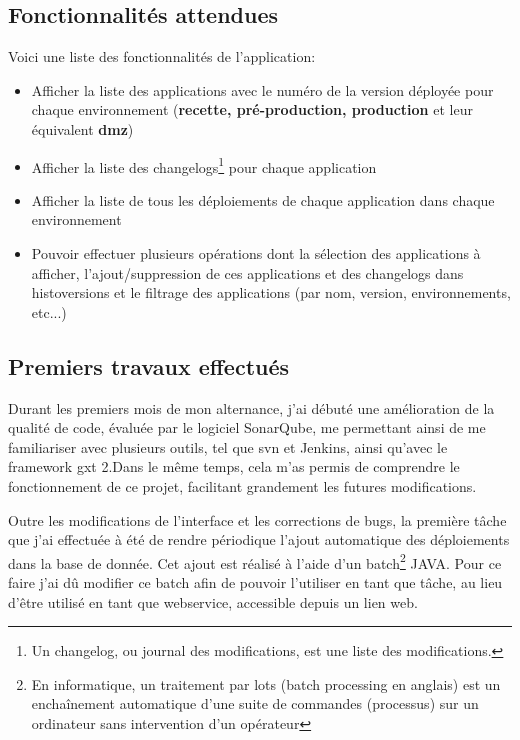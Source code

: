 \documentclass[12pt]{report}
\begin{document}
    \subsection{Fonctionnalités attendues}
    Voici une liste des fonctionnalités de l'application:\vspace{-1em}
    \begin{itemize}
        \item Afficher la liste des applications avec le numéro de la version déployée pour chaque environnement (\textbf{recette, pré-production, production} et leur équivalent \textbf{\gls{dmz}})
        \item Afficher la liste des changelogs\footnote{Un changelog, ou journal des modifications, est une liste des modifications\cite{wiki:changelog}.} pour chaque application
        \item Afficher la liste de tous les déploiements de chaque application dans chaque environnement
        \item Pouvoir effectuer plusieurs opérations dont la sélection des applications à afficher, l'ajout/suppression de ces applications et des changelogs dans histoversions et le filtrage des applications (par nom, version, environnements, etc...)
    \end{itemize}
    
    
    \subsection{Premiers travaux effectués}
    
    Durant les premiers mois de mon alternance, j'ai débuté une amélioration de la qualité de code, évaluée par le logiciel SonarQube, me permettant ainsi de me familiariser avec plusieurs outils, tel que \gls{svn} et Jenkins, ainsi qu'avec le framework \gls{gxt} 2.Dans le même temps, cela m'as permis de comprendre le fonctionnement de ce projet, facilitant grandement les futures modifications.
    
    Outre les modifications de l'interface et les corrections de bugs, la première tâche que j'ai effectuée à été de rendre périodique l'ajout automatique des déploiements dans la base de donnée. Cet ajout est réalisé à l'aide d'un batch\footnote{En informatique, un traitement par lots (batch processing en anglais) est un enchaînement automatique d'une suite de commandes (processus) sur un ordinateur sans intervention d'un opérateur\cite{wiki:batch}} JAVA. Pour ce faire j'ai dû modifier ce batch afin de pouvoir l'utiliser en tant que tâche, au lieu d'être utilisé en tant que webservice, accessible depuis un lien web.
    
\end{document}
